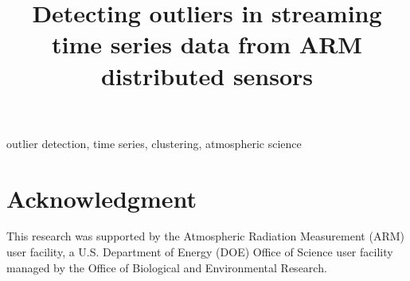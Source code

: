 \documentclass[conference]{IEEEtran}
\begin{document}
\title{Detecting outliers in streaming time series data from ARM distributed sensors
}

\author{
\and
{}
\and
{}
\and
{}
}

\maketitle



\begin{IEEEkeywords}
outlier detection, time series, clustering, atmospheric science
\end{IEEEkeywords}











\section*{Acknowledgment}
This research was supported by the Atmospheric Radiation Measurement (ARM) user 
facility, a U.S. Department of Energy (DOE) Office of Science user facility 
managed by the Office of Biological and Environmental Research.


 

\end{document}
